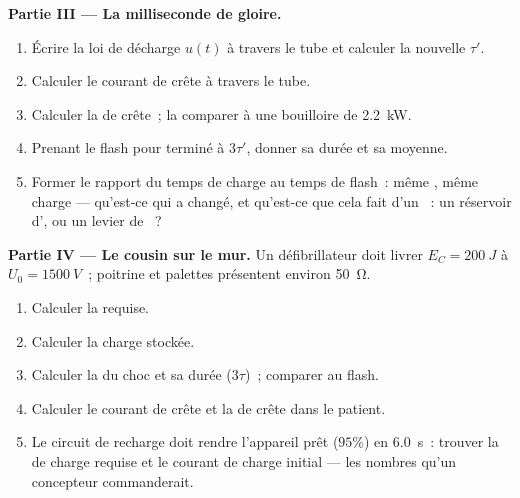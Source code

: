 \begin{problem}
\medskip
\noindent\textbf{Partie III --- La milliseconde de gloire.}
\begin{enumerate}[resume]
  \item Écrire la loi de décharge $u(t)$ à travers le tube et calculer
        la nouvelle  $\tau'$.
  \item Calculer le courant de crête à travers le tube.
  \item Calculer la  de crête~; la comparer à une
        bouilloire de \qty{2.2}{kW}.
  \item Prenant le flash pour terminé à $3\tau'$, donner sa durée et
        sa  moyenne.
  \item Former le rapport du temps de charge au temps de flash~: même
        , même charge --- qu'est-ce qui a
        changé, et qu'est-ce que cela fait d'un
        ~: un réservoir
        d', ou un levier de
        ~?
\end{enumerate}

\medskip
\noindent\textbf{Partie IV --- Le cousin sur le mur.}
Un défibrillateur doit livrer $E_C = \qty{200}{J}$ à
$U_0 = \qty{1500}{V}$~; poitrine et palettes présentent environ
\qty{50}{\ohm}.
\begin{enumerate}[resume]
  \item Calculer la  requise.
  \item Calculer la charge stockée.
  \item Calculer la  du choc et sa
        durée ($3\tau$)~; comparer au flash.
  \item Calculer le courant de crête et la
         de crête dans le patient.
  \item Le circuit de recharge doit rendre l'appareil prêt ($95\%$) en
        \qty{6.0}{s}~: trouver la  de charge
        requise et le courant de charge initial --- les nombres qu'un
        concepteur commanderait.
\end{enumerate}
\end{problem}
